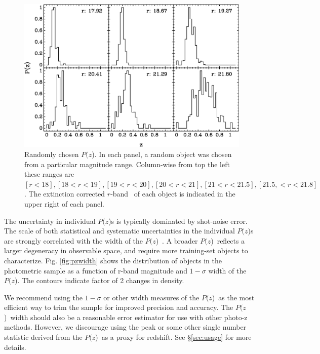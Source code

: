\documentclass[preprint]{aastex}
\newcommand{\pofz}{$P(z$)}
\begin{document}
\begin{figure} [t]\centering
    \includegraphics[scale=0.7]{figures/seed25-5-6pofz.eps}
    \caption{Randomly chosen \pofz.  In each panel, a random object was
    chosen from a particular magnitude range.  Column-wise from top the
    left these ranges are $[r < 18], [18 < r < 19], [19 < r < 20], 
    [20 < r < 21], [21 < r < 21.5], [21.5, < r < 21.8]$.  
    The extinction corrected $r$-band \cmodelmag\ of each object
    is indicated in the upper right of each panel.
    \label{fig:rand6pofz}}
\end{figure}

The uncertainty in individual \pofz s is typically dominated by shot-noise
error.  The scale of both statistical and systematic uncertainties in the
individual \pofz s are strongly correlated with the width of the \pofz\
\citep{CunhaPhotoz09}.  A broader \pofz\ reflects a larger degeneracy in
observable space, and require more training-set objects to characterize.  Fig.
\ref{fig:pzwidth} shows the distribution of objects in the photometric sample
as a function of r-band magnitude and $1-\sigma$ width of the \pofz.  The
contours indicate factor of 2 changes in density.  

We recommend using the $1-\sigma$ or other width measures of the \pofz\ as the
most efficient way to trim the sample for improved precision and accuracy.  The
\pofz\ width should also be a reasonable error estimator for use with other
photo-z methods.  However, we discourage using the peak or some other single
number statistic derived from the \pofz\ as a proxy for redshift. See 
\S \ref{sec:usage} for more details.

\end{document}

